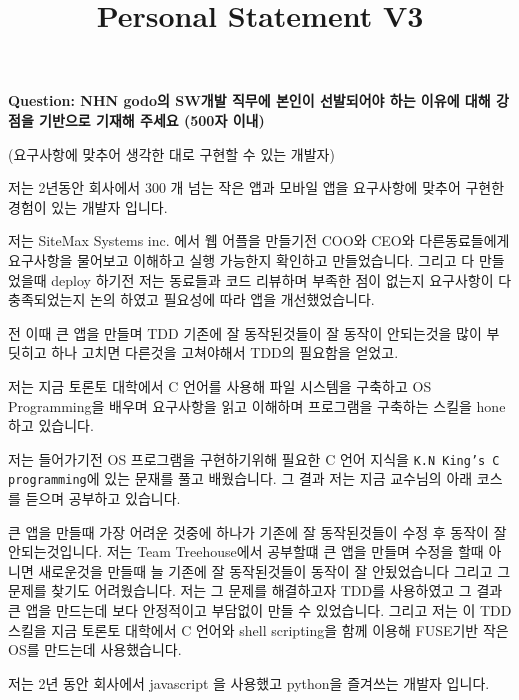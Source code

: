 \documentclass[12pt]{article}
\begin{document}
\title{Personal Statement V3}
\maketitle

\textbf{Question: NHN godo의 SW개발 직무에 본인이 선발되어야 하는 이유에 대해 강점을 기반으로 기재해 주세요 (500자 이내)}

\bigskip

(요구사항에 맞추어 생각한 대로 구현할 수 있는 개발자)

\bigskip

저는 2년동안 회사에서 300 개 넘는 작은 앱과 모바일 앱을 요구사항에 맞추어 구현한 경험이 있는 개발자 입니다.

\bigskip

저는 SiteMax Systems inc. 에서 웹 어플을 만들기전 COO와 CEO와 다른동료들에게 요구사항을 물어보고 이해하고 실행 가능한지 확인하고 만들었습니다.
그리고 다 만들었을때 deploy 하기전 저는 동료들과 코드 리뷰하며 부족한 점이 없는지 요구사항이 다 충족되었는지 논의 하였고 필요성에 따라 앱을 개선했었습니다.

\bigskip

전 이때 큰 앱을 만들며 TDD 기존에 잘 동작된것들이 잘 동작이 안되는것을 많이 부딧히고 하나 고치면 다른것을
고쳐야해서 TDD의 필요함을 얻었고.

\bigskip

저는 지금 토론토 대학에서 C 언어를 사용해 파일 시스템을 구축하고 OS Programming을 배우며
요구사항을 읽고 이해하며 프로그램을 구축하는 스킬을 hone 하고 있습니다.

\bigskip

저는 들어가기전 OS 프로그램을 구현하기위해 필요한 C 언어 지식을 \texttt{K.N King's C programming}에 있는 문재를 풀고 배웠습니다.
그 결과 저는 지금 교수님의 아래 코스를 듣으며 공부하고 있습니다.

\bigskip

큰 앱을 만들때 가장 어려운 것중에 하나가 기존에 잘 동작된것들이 수정 후 동작이 잘 안되는것입니다.
저는 Team Treehouse에서 공부할떄 큰 앱을 만들며 수정을 할때 아니면 새로운것을 만들때 늘 기존에 잘 동작된것들이 동작이 잘 안됬었습니다 그리고 그 문제를 찾기도 어려웠습니다.
저는 그 문제를 해결하고자 TDD를 사용하였고 그 결과 큰 앱을 만드는데 보다 안정적이고 부담없이 만들 수 있었습니다.
그리고 저는 이 TDD 스킬을 지금 토론토 대학에서 C 언어와 shell scripting을 함께 이용해 FUSE기반 작은 OS를 만드는데 사용했습니다.

\bigskip

저는 2년 동안 회사에서 javascript 을 사용했고 python을 즐겨쓰는 개발자 입니다.
\end{document}
